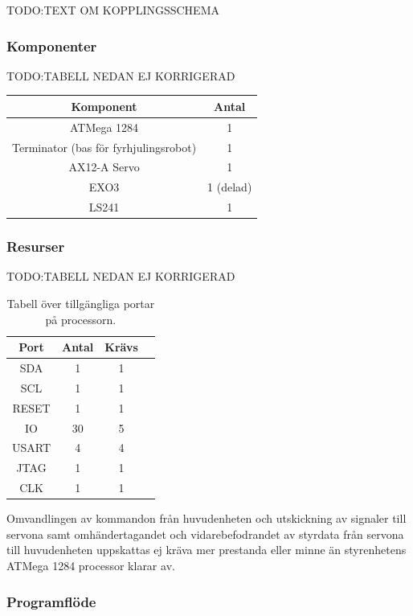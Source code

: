 \documentclass{article}
\begin{document}
TODO:TEXT OM KOPPLINGSSCHEMA

\subsubsection{Komponenter}
TODO:TABELL NEDAN EJ KORRIGERAD
\begin{table}[H]
  \centering
  \begin{tabular}{ | c | c |}
    \hline
    \textbf{Komponent} & \textbf{Antal} \\
    \hline
    ATMega 1284 & 1 \\
    \hline
    Terminator (bas för fyrhjulingsrobot) & 1 \\
    \hline
    AX12-A Servo & 1 \\
    \hline
    EXO3 & 1 (delad) \\
    \hline
    LS241 & 1 \\
    \hline
  \end{tabular}
\end{table}


\subsubsection{Resurser}
TODO:TABELL NEDAN EJ KORRIGERAD
\begin{table}[H]
  \centering
  \begin{tabular}{ | c | c | c | c |}
    \hline
    \textbf{Port} & \textbf{Antal} & \textbf{Krävs} \\
    \hline
    SDA & 1 & 1 \\
    \hline
    SCL & 1 & 1 \\
    \hline
    RESET & 1 & 1 \\
    \hline
    IO & 30 & 5 \\
    \hline
    USART & 4 & 4 \\
    \hline
    JTAG & 1 & 1 \\
    \hline
    CLK & 1 & 1 \\
    \hline
  \end{tabular}
  \caption{Tabell över tillgängliga portar på processorn.}
\end{table}

Omvandlingen av kommandon från huvudenheten och utskickning av signaler till servona samt omhändertagandet och vidarebefodrandet av styrdata från servona till huvudenheten uppskattas ej kräva mer prestanda eller minne än styrenhetens ATMega 1284 processor klarar av.

\subsubsection{Programflöde}
\end{document}
